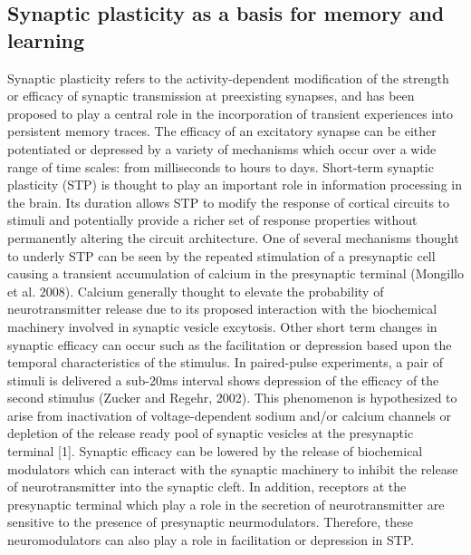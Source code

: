 \documentclass{ucetd}
\begin{document}
\subsection{Synaptic plasticity as a basis for memory and learning}

Synaptic plasticity refers to the activity-dependent modification of the strength or efficacy of synaptic transmission at preexisting synapses, and has been proposed to play a central role in the incorporation of transient experiences into persistent memory traces. The efficacy of an excitatory synapse can be either potentiated or depressed by a variety of mechanisms which occur over a wide range of time scales: from milliseconds to hours to days. Short-term synaptic plasticity (STP) is thought to play an important role in information processing in the brain. Its duration allows STP to modify the response of cortical circuits to stimuli and potentially provide a richer set of response properties without permanently altering the circuit architecture. One of several mechanisms thought to underly STP can be seen by the repeated stimulation of a presynaptic cell causing a transient accumulation of calcium in the presynaptic terminal (Mongillo et al. 2008). Calcium generally thought to elevate the probability of neurotransmitter release due to its proposed interaction with the biochemical machinery involved in synaptic vesicle excytosis. Other short term changes in synaptic efficacy can occur such as the facilitation or depression based upon the temporal characteristics of the stimulus. In paired-pulse experiments, a pair of stimuli is delivered a sub-20ms interval shows depression of the efficacy of the second stimulus (Zucker and Regehr, 2002). This phenomenon is hypothesized to arise from inactivation of voltage-dependent sodium and/or calcium channels or depletion of the release ready pool of synaptic vesicles at the presynaptic terminal [1]. Synaptic efficacy can be lowered by the release of biochemical modulators which can interact with the synaptic machinery to inhibit the release of neurotransmitter into the synaptic cleft. In addition, receptors at the presynaptic terminal which play a role in the secretion of neurotransmitter are sensitive to the presence of presynaptic neurmodulators. Therefore, these neuromodulators can also play a role in facilitation or depression in STP.
\end{document}
